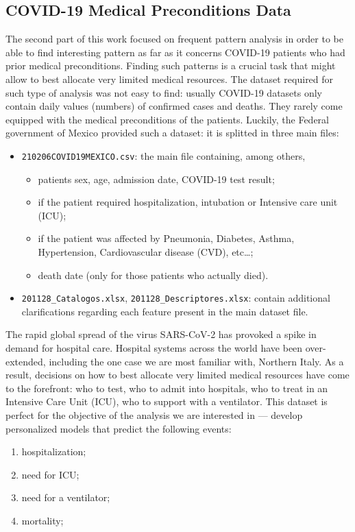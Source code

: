 \documentclass[11pt,a4paper]{article}
\begin{document}
\subsection{COVID-19 Medical Preconditions Data}
The second part of this work focused on frequent pattern analysis in order to be
able to find interesting pattern as far as it concerns COVID-19 patients who
had prior medical preconditions. Finding such patterns is a crucial task that
might allow to best allocate very limited medical resources. The dataset
required for such type of analysis was not easy to find: usually COVID-19
datasets only contain daily values (numbers) of confirmed cases and deaths. They
rarely come equipped with the medical preconditions of the patients. Luckily,
the Federal government of Mexico\cite{mexico} provided such a dataset: it is
splitted in three main files:
\begin{itemize}
    \item \texttt{210206COVID19MEXICO.csv}: the main file containing, among
    others,
    \begin{itemize}
        \item patients sex, age, admission date, COVID-19 test result;
        \item if the patient required hospitalization, intubation or Intensive
        care unit (ICU);
        \item if the patient was affected by Pneumonia, Diabetes, Asthma,
        Hypertension, Cardiovascular disease (CVD), etc\dots;
        \item death date (only for those patients who actually died).
    \end{itemize}
    \item \texttt{201128\_Catalogos.xlsx}, \texttt{201128\_Descriptores.xlsx}:
    contain additional clarifications regarding each feature present in the main
    dataset file.
\end{itemize}
The rapid global spread of the virus SARS-CoV-2 has provoked a spike in
demand for hospital care. Hospital systems across the world have been
over-extended, including the one case we are most familiar with, Northern Italy.
As a result, decisions on how to best allocate very limited medical resources
have come to the forefront: who to test, who to admit into hospitals, who to
treat in an Intensive Care Unit (ICU), who to support with a ventilator.
This dataset is perfect for the objective of the analysis we are interested in
--- develop personalized models that predict the following events:
\begin{enumerate}
    \item hospitalization;
    \item need for ICU;
    \item need for a ventilator;
    \item mortality;
\end{enumerate}
\end{document}
